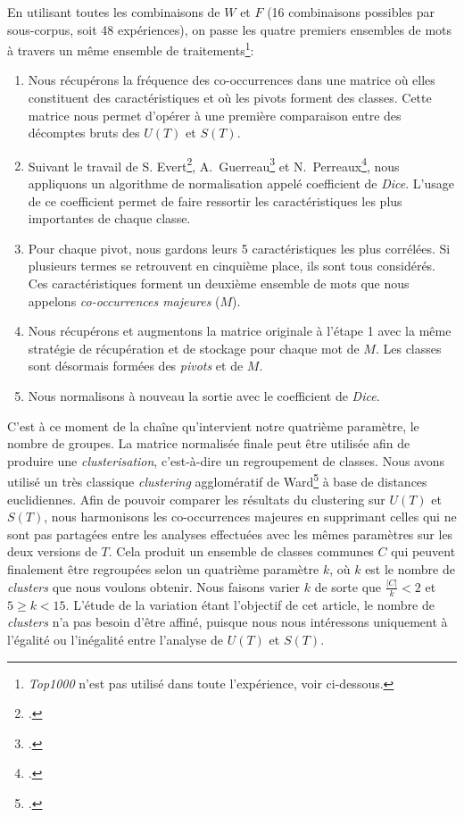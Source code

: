 En utilisant toutes les combinaisons de $W$ et $F$ (16 combinaisons possibles par sous-corpus, soit 48 expériences), on passe les quatre premiers ensembles de mots à travers un même ensemble de traitements\footnote{\textit{Top1000} n'est pas utilisé dans toute l'expérience, voir ci-dessous.}:
\begin{enumerate}
    \item Nous récupérons la fréquence des co-occurrences dans une matrice où elles constituent des caractéristiques et où les pivots forment des classes. Cette matrice nous permet d'opérer à une première comparaison entre des décomptes bruts des $U(T)$ et $S(T)$.
    \item Suivant le travail de S. Evert\footcite{evert2005statistics}, A.~Guerreau\footcite{morsel:guerreau} et N.~Perreaux\footcite{perreaux:cbma}, nous appliquons un algorithme de normalisation appelé coefficient de \textit{Dice}. L'usage de ce coefficient permet de faire ressortir les caractéristiques les plus importantes de chaque classe.
    \item Pour chaque pivot, nous gardons leurs 5 caractéristiques les plus corrélées. Si plusieurs termes se retrouvent en cinquième place, ils sont tous considérés. Ces caractéristiques forment un deuxième ensemble de mots que nous appelons \textit{co-occurrences majeures} ($M$).
    \item Nous récupérons et augmentons la matrice originale à l'étape 1 avec la même stratégie de récupération et de stockage pour chaque mot de $M$. Les classes sont désormais formées des \textit{pivots} et de $M$.
    \item Nous normalisons à nouveau la sortie avec le coefficient de \textit{Dice}.
\end{enumerate}

C'est à ce moment de la chaîne qu'intervient notre quatrième paramètre, le nombre de groupes. La matrice normalisée finale peut être utilisée afin de produire une \textit{clusterisation}, c'est-à-dire un regroupement de classes. Nous avons utilisé un très classique \textit{clustering} agglomératif de Ward\footcite{ward1963hierarchical} à base de distances euclidiennes. Afin de pouvoir comparer les résultats du clustering sur $U(T)$ et $S(T)$, nous harmonisons les co-occurrences majeures en supprimant celles qui ne sont pas partagées entre les analyses effectuées avec les mêmes paramètres sur les deux versions de $T$. Cela produit un ensemble de classes communes $C$ qui peuvent finalement être regroupées selon un quatrième paramètre $k$, où $k$ est le nombre de \textit{clusters} que nous voulons obtenir. Nous faisons varier $k$ de sorte que $\frac{\left | C \right |}{k} < 2$ et $5 \geq k < 15$. L'étude de la variation étant l'objectif de cet article, le nombre de \textit{clusters} n'a pas besoin d'être affiné, puisque nous nous intéressons uniquement à l'égalité ou l'inégalité entre l'analyse de $U(T)$ et $S(T)$.


